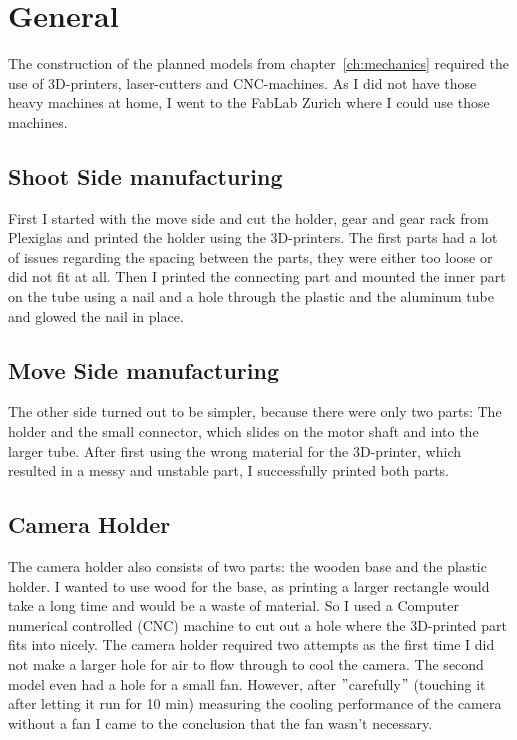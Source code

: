 \section{General}\label{sec:general3}
The construction of the planned models from chapter~\ref{ch:mechanics} required the use of 3D-printers, laser-cutters and CNC-machines.
As I did not have those heavy machines at home, I went to the FabLab Zurich\autocite{fablab} where I could use those machines.

\subsection{Shoot Side manufacturing}\label{subsec:turn-side-manufacturing}
First I started with the move side and cut the holder, gear and gear rack from Plexiglas and printed the holder using the 3D-printers.
The first parts had a lot of issues regarding the spacing between the parts, they were either too loose or did not fit at all.
Then I printed the connecting part and mounted the inner part on the tube using a nail and a hole through the plastic and the aluminum tube and glowed the nail in place.

\subsection{Move Side manufacturing}\label{subsec:move-side-manufacturing}
The other side turned out to be simpler, because there were only two parts: The holder and the small connector, which slides on the motor shaft and into the larger tube.
After first using the wrong material for the 3D-printer, which resulted in a messy and unstable part, I successfully printed both parts.

\subsection{Camera Holder}\label{subsec:camera-holder}
The camera holder also consists of two parts: the wooden base and the plastic holder.
I wanted to use wood for the base, as printing a larger rectangle would take a long time and would be a waste of material.
So I used a Computer numerical controlled (CNC) machine to cut out a hole where the 3D-printed part fits into nicely.
The camera holder required two attempts as the first time I did not make a larger hole for air to flow through to cool the camera.
The second model even had a hole for a small fan.
However, after \("\)carefully\("\) (touching it after letting it run for 10 min) measuring the cooling performance of the camera without a fan I came to the conclusion that the fan wasn't necessary.
